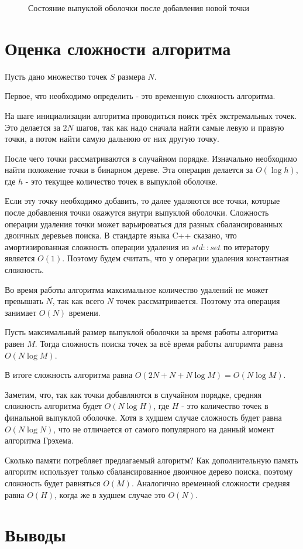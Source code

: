 
\begin{figure}[H]
	\centering
	
	\caption{Состояние выпуклой оболочки после добавления новой точки}
	\label{img:my_proof}
\end{figure}

\section{Оценка сложности алгоритма} \label{subsect2_4}


Пусть дано множество точек $S$ размера $N$.

Первое, что необходимо определить - это временную сложность алгоритма.

На шаге инициализации алгоритма проводиться поиск трёх экстремальных точек. Это делается за $2 N$ шагов, так как надо сначала найти самые левую и правую точки, а потом найти самую дальнюю от них другую точку.

После чего точки рассматриваются в случайном порядке. Изначально необходимо найти положение точки в бинарном дереве. Эта операция делается за $O(\log h)$, где $h$ - это текущее количество точек в выпуклой оболочке.


Если эту точку необходимо добавить, то далее удаляются все точки, которые после добавления точки окажутся внутри выпуклой оболочки. Сложность операции удаления точки может варьироваться для разных сбалансированных двоичных деревьев поиска. В стандарте языка C++ сказано, что амортизированная сложность операции удаления из $std::set$ по итератору является $O(1)$. Поэтому будем считать, что у операции удаления константная сложность.

Во время работы алгоритма максимальное количество удалений не может превышать $N$, так как всего $N$ точек рассматривается. Поэтому эта операция занимает $O(N)$ времени.

Пусть максимальный размер выпуклой оболочки за время работы алгоритма равен $M$. Тогда сложность поиска точек за всё время работы алгоримта равна $O(N \log M)$.

В итоге сложность алгоритма равна $O(2 N + N + N \log M) = O(N \log M)$.

Заметим, что, так как точки добавляются в случайном порядке, средняя сложность алгоритма будет $O(N \log H)$, где $H$ - это количество точек в финальной выпуклой оболочке. Хотя в худшем случае сложность будет равна $O(N \log N)$, что не отличается от самого популярного на данный момент алгоритма Грэхема.

Сколько памяти потребляет предлагаемый алгоритм? Как дополнительную память алгоритм использует только сбалансированное двоичное дерево поиска, поэтому сложность будет равняться $O(M)$. Аналогично временной сложности средняя равна $O(H)$, когда же в худшем случае это $O(N)$.


\section{Выводы} \label{subsect2_5}
